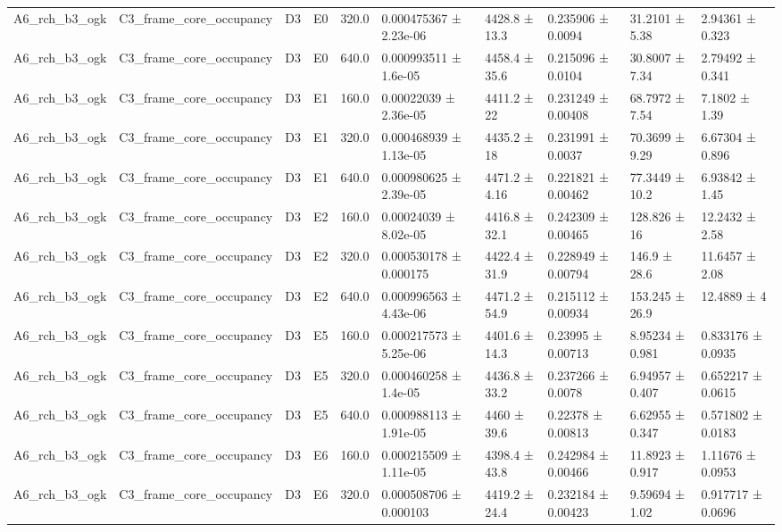 \begin{table}
\begin{tabular}{llllllllll}
A6\_rch\_b3\_ogk & C3\_frame\_core\_occupancy & D3 & E0 & 320.0 & 0.000475367 ± 2.23e-06 & 4428.8 ± 13.3 & 0.235906 ± 0.0094 & 31.2101 ± 5.38 & 2.94361 ± 0.323 \\
A6\_rch\_b3\_ogk & C3\_frame\_core\_occupancy & D3 & E0 & 640.0 & 0.000993511 ± 1.6e-05 & 4458.4 ± 35.6 & 0.215096 ± 0.0104 & 30.8007 ± 7.34 & 2.79492 ± 0.341 \\
A6\_rch\_b3\_ogk & C3\_frame\_core\_occupancy & D3 & E1 & 160.0 & 0.00022039 ± 2.36e-05 & 4411.2 ± 22 & 0.231249 ± 0.00408 & 68.7972 ± 7.54 & 7.1802 ± 1.39 \\
A6\_rch\_b3\_ogk & C3\_frame\_core\_occupancy & D3 & E1 & 320.0 & 0.000468939 ± 1.13e-05 & 4435.2 ± 18 & 0.231991 ± 0.0037 & 70.3699 ± 9.29 & 6.67304 ± 0.896 \\
A6\_rch\_b3\_ogk & C3\_frame\_core\_occupancy & D3 & E1 & 640.0 & 0.000980625 ± 2.39e-05 & 4471.2 ± 4.16 & 0.221821 ± 0.00462 & 77.3449 ± 10.2 & 6.93842 ± 1.45 \\
A6\_rch\_b3\_ogk & C3\_frame\_core\_occupancy & D3 & E2 & 160.0 & 0.00024039 ± 8.02e-05 & 4416.8 ± 32.1 & 0.242309 ± 0.00465 & 128.826 ± 16 & 12.2432 ± 2.58 \\
A6\_rch\_b3\_ogk & C3\_frame\_core\_occupancy & D3 & E2 & 320.0 & 0.000530178 ± 0.000175 & 4422.4 ± 31.9 & 0.228949 ± 0.00794 & 146.9 ± 28.6 & 11.6457 ± 2.08 \\
A6\_rch\_b3\_ogk & C3\_frame\_core\_occupancy & D3 & E2 & 640.0 & 0.000996563 ± 4.43e-06 & 4471.2 ± 54.9 & 0.215112 ± 0.00934 & 153.245 ± 26.9 & 12.4889 ± 4 \\
A6\_rch\_b3\_ogk & C3\_frame\_core\_occupancy & D3 & E5 & 160.0 & 0.000217573 ± 5.25e-06 & 4401.6 ± 14.3 & 0.23995 ± 0.00713 & 8.95234 ± 0.981 & 0.833176 ± 0.0935 \\
A6\_rch\_b3\_ogk & C3\_frame\_core\_occupancy & D3 & E5 & 320.0 & 0.000460258 ± 1.4e-05 & 4436.8 ± 33.2 & 0.237266 ± 0.0078 & 6.94957 ± 0.407 & 0.652217 ± 0.0615 \\
A6\_rch\_b3\_ogk & C3\_frame\_core\_occupancy & D3 & E5 & 640.0 & 0.000988113 ± 1.91e-05 & 4460 ± 39.6 & 0.22378 ± 0.00813 & 6.62955 ± 0.347 & 0.571802 ± 0.0183 \\
A6\_rch\_b3\_ogk & C3\_frame\_core\_occupancy & D3 & E6 & 160.0 & 0.000215509 ± 1.11e-05 & 4398.4 ± 43.8 & 0.242984 ± 0.00466 & 11.8923 ± 0.917 & 1.11676 ± 0.0953 \\
A6\_rch\_b3\_ogk & C3\_frame\_core\_occupancy & D3 & E6 & 320.0 & 0.000508706 ± 0.000103 & 4419.2 ± 24.4 & 0.232184 ± 0.00423 & 9.59694 ± 1.02 & 0.917717 ± 0.0696 \\

\end{tabular}
\end{table}

